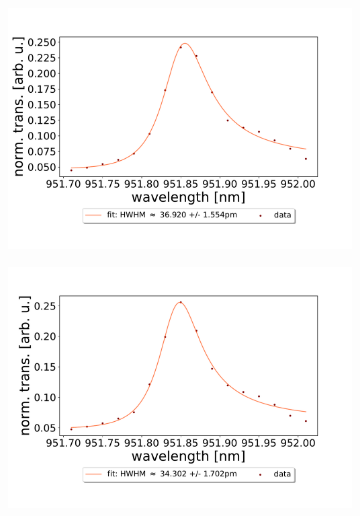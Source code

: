 \begin{figure}[h!]
\begin{subfigure}[b]{0.49\textwidth}
        \includegraphics[width=\textwidth]{figures/results/double fano fits/550um_M3:M5_fit_3.pdf}
        \caption{}
        \label{fig:550um_M3:M5_fit_3}
    \end{subfigure}
    \begin{subfigure}[b]{0.49\textwidth}
        \includegraphics[width=\textwidth]{figures/results/double fano fits/550um_M3:M5_fit_4.pdf}
        \caption{}
        \label{fig:550um_M3:M5_fit_4}
    \end{subfigure}
    \begin{subfigure}[b]{0.49\textwidth}

\end{subfigure}
\end{figure}
